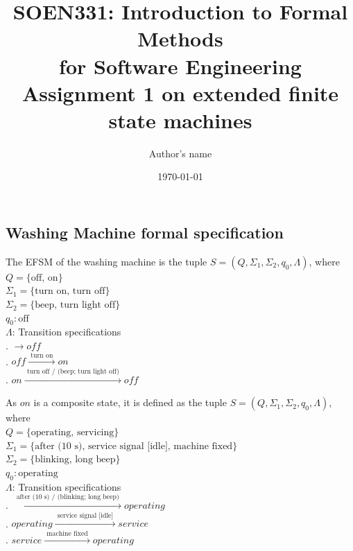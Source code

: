 \documentclass[12pt]{article}
\title{SOEN331: Introduction to Formal Methods\\for Software Engineering\\
Assignment 1 on extended finite state machines}
\author{Author's name}
\date{\today}
\begin{document}
\begin{spacing}{1.5}

\maketitle

\section{Washing Machine formal specification}

\noindent The EFSM of the washing machine is the tuple $S = (Q, \Sigma_1, \Sigma_2, q_0, \Lambda)$, where\\
\noindent $Q = \{\text {off, on}\}$\\
\noindent $\Sigma_1 = \{\text {turn on, turn off}\}$\\
\noindent $\Sigma_2 = \{\text {beep, turn light off}\}$\\
\noindent $q_0: \text{off}$\\
\noindent $\Lambda$: Transition specifications\\
. $\rightarrow off $\\
. $off \xrightarrow {\text { turn on }} on$\\
. $on \xrightarrow {\text { turn off / (beep; turn light off) }} off$\\
\newpage

\noindent As $on$ is a composite state, it is defined as the tuple $S = (Q, \Sigma_1, \Sigma_2, q_0, \Lambda)$, where\\
\noindent $Q = \{\text {operating, servicing}\}$\\
\noindent $\Sigma_1 = \{\text {after (10 s), service signal [idle], machine fixed}\}$\\
\noindent $\Sigma_2 = \{\text {blinking, long beep}\}$\\
\noindent $q_0: \text{operating}$\\
\noindent $\Lambda$: Transition specifications\\
. $\xrightarrow {\text { after (10 s) / (blinking; long beep) }} operating$\\
. $operating \xrightarrow {\text { service signal [idle] }} service$\\
. $service \xrightarrow {\text { machine fixed }} operating$\\


\end{spacing}
\end{document}
